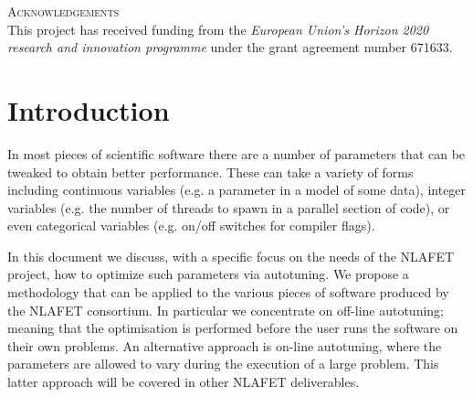 \documentclass[a4paper,12pt]{article}
\begin{document}
\vspace{2em}





\noindent
\textsc{Acknowledgements}\\[1em]
This project has received funding from the \emph{European Union's Horizon 2020 research and innovation programme} under the grant agreement number 671633.





%

\newpage

\renewcommand{\contentsname}{Table of Contents}
\tableofcontents

\listoffigures



\newpage

%

\section{Introduction}
\label{sec.introduction}
In most pieces of scientific software there are a number of parameters
that can be tweaked to obtain better performance.  These can take a
variety of forms including continuous variables (e.g. a parameter in a
model of some data), integer variables (e.g. the number of threads to
spawn in a parallel section of code), or even categorical variables
(e.g. on/off switches for compiler flags).

In this document we discuss, with a specific focus on the needs of the
NLAFET project, how to optimize such parameters via autotuning.
We propose a methodology that can be applied to
the various pieces of software produced by the NLAFET consortium.
In particular we concentrate on off-line autotuning; meaning that the
optimisation is performed before the user runs the software on
their own problems.  An alternative approach is on-line autotuning,
where the parameters are allowed to vary during the execution of a
large problem.  This latter approach will be covered in other NLAFET
deliverables.
\end{document}
